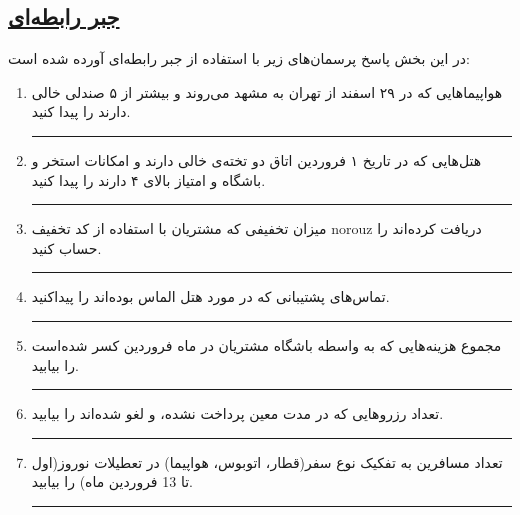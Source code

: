 \subsection*{\underline{جبر رابطه‌ای}}

در این بخش پاسخ پرسمان‌های زیر با استفاده از جبر رابطه‌ای آورده شده است:

\begin{enumerate}
	\item
	‌هواپیماهایی که در ۲۹ اسفند از تهران به مشهد می‌روند و بیشتر از ۵ صندلی خالی دارند را پیدا کنید.
	
	
	
	
	\rule{\linewidth}{0.05mm}
	
	\item
	هتل‌هایی که در تاریخ ۱ فروردین اتاق دو تخته‌ی خالی دارند و امکانات استخر و باشگاه و \linebreak امتیاز بالای ۴ دارند را پیدا کنید.
	
	
	
	\rule{\linewidth}{0.05mm}
	
	
	\item
	میزان تخفیفی که مشتریان با استفاده از کد تخفیف  norouz  دریافت کرده‌اند را حساب کنید.
	
	
	\rule{\linewidth}{0.05mm}
	
	
	\item
	تماس‌های پشتیبانی که در مورد هتل الماس بوده‌اند را پیداکنید.
	
	
	\rule{\linewidth}{0.05mm}	 
	
	\pagebreak
	
	
	\item
	مجموع هزینه‌هایی که‌ به واسطه باشگاه مشتریان در ماه فروردین کسر شده‌است را بیابید.
	
	
	\rule{\linewidth}{0.05mm}
	
		
	
	\item
	تعداد رزروهایی که در مدت معین پرداخت نشده، و لغو شده‌اند را بیابید.
	
	
	\rule{\linewidth}{0.05mm}
	
	
	
	
	\item
	تعداد مسافرین به تفکیک نوع سفر(قطار، اتوبوس، هواپیما) در تعطیلات نوروز(اول تا 13 فروردین ماه) را بیابید.
	
	
	\rule{\linewidth}{0.05mm}
	

\end{enumerate}
